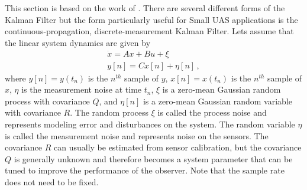 This section is based on the work of \cite{Beard2010}. There are several different forms of the Kalman Filter but the form particularly useful for Small UAS applications is the continuous-propagation, discrete-measurement Kalman Filter.
Lets assume that the linear system dynamics are given by
\begin{equation}\label{eq:linear_model}
\begin{aligned}
\dot{x}=Ax+Bu+\xi\\
y[n]=Cx[n]+\eta[n]\,,
\end{aligned}
\end{equation}
where \begin{math} y[n] = y(t_n) \end{math} is the \begin{math} n^{th} \end{math} sample of \begin{math} y \end{math}, \begin{math} x[n] = x(t_n) \end{math} is the \begin{math} n^{th} \end{math} sample of \begin{math} x \end{math}, \begin{math} \eta \end{math} is the measurement noise at time \begin{math} t_n\end{math}, \begin{math} \xi \end{math} is a zero-mean Gaussian random process with covariance \begin{math} Q \end{math}, and \begin{math} \eta[n] \end{math} is a zero-mean Gaussian random variable with covariance \begin{math} R \end{math}. The random process \begin{math} \xi \end{math} is called the process noise and represents modeling error and disturbances on the system. The random variable \begin{math} \eta \end{math} is called the measurement noise and represents noise on the sensors. The covariance \begin{math} R \end{math} can usually be estimated from sensor calibration, but the covariance \begin{math} Q \end{math} is generally unknown and therefore becomes a system parameter that can be tuned to improve the performance of the observer. Note that the sample rate does not need to be fixed. \linebreak
